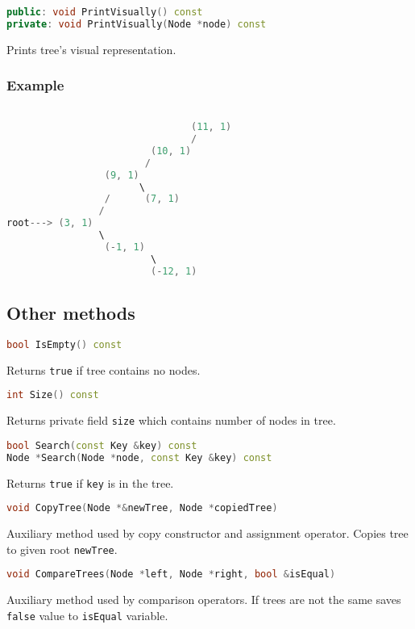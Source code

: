 \documentclass{article}
\begin{document}
\begin{lstlisting}[language=C++]
public: void PrintVisually() const
private: void PrintVisually(Node *node) const
\end{lstlisting}
Prints tree's visual representation.

\subsubsection*{Example}
\begin{lstlisting}[language=C++]

                                (11, 1)
                                /
                         (10, 1)
                        /
                 (9, 1)
                       \
                 /      (7, 1)
                /
root---> (3, 1)
                \
                 (-1, 1)
                         \
                         (-12, 1)
\end{lstlisting}
\vspace{\baselineskip}

\subsection{Other methods}

\begin{lstlisting}[language=C++]
bool IsEmpty() const
\end{lstlisting}
Returns {\tt true} if tree contains no nodes.

\begin{lstlisting}[language=C++]
int Size() const
\end{lstlisting}
Returns private field {\tt size} which contains number of nodes in tree.

\begin{lstlisting}[language=C++]
bool Search(const Key &key) const
Node *Search(Node *node, const Key &key) const
\end{lstlisting}
Returns {\tt true} if {\tt key} is in the tree.

\begin{lstlisting}[language=C++]
void CopyTree(Node *&newTree, Node *copiedTree)
\end{lstlisting}
Auxiliary method used by copy constructor and assignment operator. Copies tree to given
root {\tt newTree}.

\begin{lstlisting}[language=C++]
void CompareTrees(Node *left, Node *right, bool &isEqual)
\end{lstlisting}
Auxiliary method used by comparison operators. If trees are not the same saves {\tt false}
value to {\tt isEqual} variable.
\vspace{\baselineskip}
\end{document}

